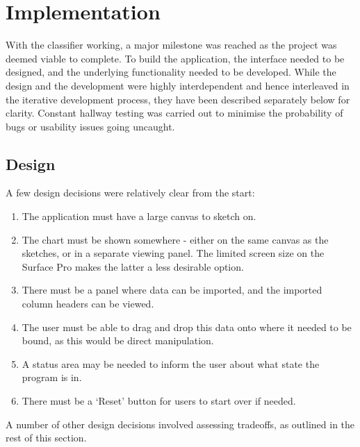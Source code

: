 \chapter{Implementation}
With the classifier working, a major milestone was reached as the project was deemed viable to complete. To build the application, the interface needed to be designed, and the underlying functionality needed to be developed. While the design and the development were highly interdependent and hence interleaved in the iterative development process, they have been described separately below for clarity. Constant hallway testing was carried out to minimise the probability of bugs or usability issues going uncaught.

\section{Design}
\label{sec:design}
	A few design decisions were relatively clear from the start:
	\begin{enumerate}
	\item The application must have a large canvas to sketch on.
	\item The chart must be shown somewhere - either on the same canvas as the sketches, or in a separate viewing panel. The limited screen size on the Surface Pro makes the latter a less desirable option.
	\item There must be a panel where data can be imported, and the imported column headers can be viewed.
	\item The user must be able to drag and drop this data onto where it needed to be bound, as this would be direct manipulation.
	\item A status area may be needed to inform the user about what state the program is in.
	\item There must be a `Reset' button for users to start over if needed.
	\end{enumerate}
	
	A number of other design decisions involved assessing tradeoffs, as outlined in the rest of this section.	
	
